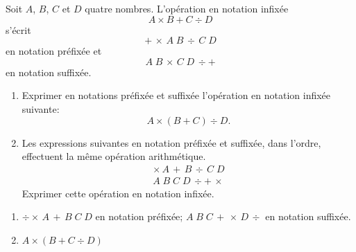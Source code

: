 \begin{exercice}
  Soit $A$, $B$, $C$ et $D$ quatre nombres. L'opération en notation
  infixée
  \begin{equation*}
    A \times B + C \div D
  \end{equation*}
  s'écrit
  \begin{equation*}
    +\, \times\, A\; B\, \div\, C\; D
  \end{equation*}
  en notation préfixée et
  \begin{equation*}
    A\; B\, \times\, C\; D\, \div +
  \end{equation*}
  en notation suffixée.
  \begin{enumerate}
  \item Exprimer en notations préfixée et suffixée l'opération en
    notation infixée suivante:
    \begin{equation*}
      A \times (B + C) \div D.
    \end{equation*}
  \item Les expressions suivantes en notation préfixée et suffixée,
    dans l'ordre, effectuent la même opération arithmétique.
    \begin{gather*}
      \times\, A\, +\, B\, \div\, C\; D \\
      A\; B\; C\; D\, \div +\, \times
    \end{gather*}
    Exprimer cette opération en notation infixée.
  \end{enumerate}
  \begin{sol}
    \begin{enumerate}
    \item $\div \times\, A\, +\, B\; C\; D$ en notation préfixée;
      $A\; B\; C\, +\, \times\, D\, \div$ en notation suffixée.
    \item $A \times (B + C \div D)$
    \end{enumerate}
  \end{sol}
\end{exercice}

